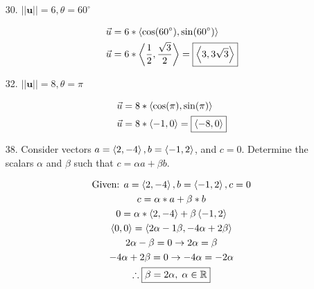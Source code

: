 \documentclass[10pt, letterpaper]{article}
\begin{document}
\begin{itemize}
        \item [30.] $||\textbf{u}|| = 6, \theta = 60^{\circ}$
        
        \begin{mdframed}
            \begin{align*}
                \vec{u} & = 6 * \expval{\cos(60^{\circ}), \sin(60^{\circ})}     \\
                \vec{u} & = 6 * \expval{\frac{1}{2}, \frac{\sqrt{3}}{2}}
                          = \boxed{\expval{3, 3\sqrt{3}}}
            \end{align*}
        \end{mdframed}

        \item [32.] $||\textbf{u}|| = 8, \theta = \pi$
        
        \begin{mdframed}
            \begin{align*}
                \vec{u} & = 8 * \expval{\cos(\pi), \sin(\pi)}     \\
                \vec{u} & = 8 * \expval{-1, 0}
                          = \boxed{\expval{-8, 0}}
            \end{align*}
        \end{mdframed}

        \item [38.] Consider vectors $a = \expval{2, -4}, b = \expval{-1, 2}$, and $c = 0$. Determine the scalars $\alpha$ and $\beta$ such that $c = \alpha a + \beta b$.
        
        \begin{mdframed}
            \begin{equation*}
                \begin{gathered}
                    \text{Given: } a = \expval{2, -4}, b = \expval{-1, 2}, c = 0    \\
                    c = \alpha * a + \beta * b                                      \\
                    0 = \alpha * \expval{2, -4} + \beta \expval{-1, 2}              \\
         \expval{0,0} = \expval{2\alpha - 1\beta, -4\alpha + 2\beta}                \\
                    2\alpha - \beta = 0 \rightarrow 2\alpha = \beta                 \\
                    -4\alpha + 2\beta = 0 \rightarrow -4\alpha = -2\alpha           \\
                    \therefore \boxed{\beta = 2\alpha, \; \alpha \in \mathbb{R}}
            \end{gathered}
            \end{equation*}
        \end{mdframed}


\end{itemize}
\end{document}
